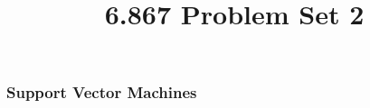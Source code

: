 \documentclass[10pt]{article}
\begin{document}
	\title{6.867 Problem Set 2}
	\maketitle
	
\subsubsection*{Support Vector Machines}
\end{document}
